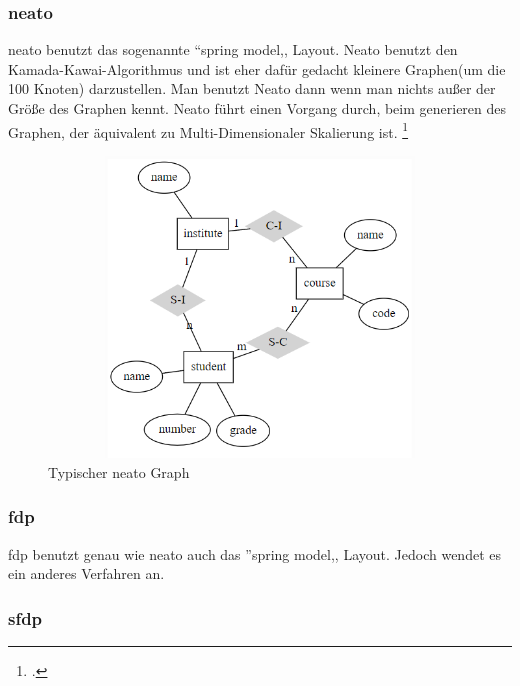 \subsubsection{neato}
\fib{}
\noindent
neato benutzt das sogenannte ``spring model,, Layout. Neato benutzt den Kamada-Kawai-Algorithmus und ist eher dafür gedacht kleinere Graphen(um die 100 Knoten) darzustellen. Man benutzt Neato dann wenn man nichts außer der Größe des Graphen kennt. Neato führt einen Vorgang durch, beim generieren des Graphen, der äquivalent zu Multi-Dimensionaler Skalierung ist.
\footcite{north_drawing_2004}
\begin{figure}[H]
	\begin{center}
		\includegraphics[width=14cm, height=8cm]{images/neato.png}
		\caption{Typischer neato Graph}
		\label{neato}
	\end{center}
\end{figure}

\noindent
\subsubsection{fdp}

\noindent
fdp benutzt genau wie neato auch das ''spring model,, Layout. Jedoch wendet es ein anderes Verfahren an.

\subsubsection{sfdp}

